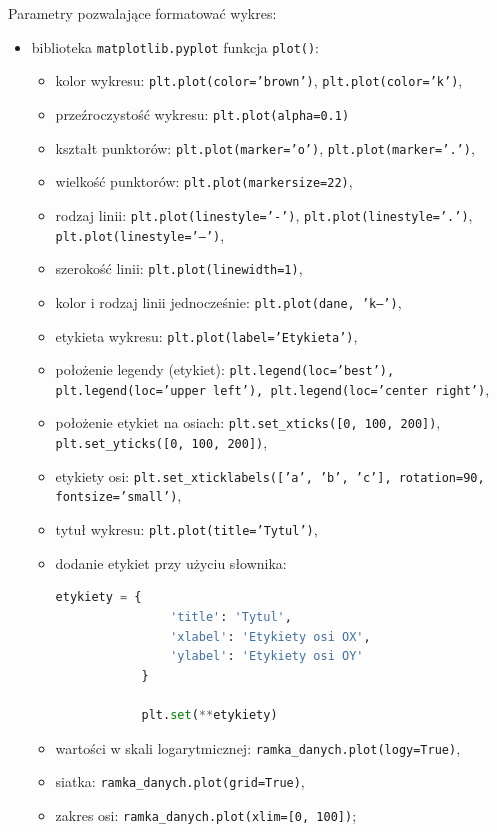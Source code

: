 \documentclass[11pt]{report}
\begin{document}
Parametry pozwalające formatować wykres:

\begin{itemize}
    \item biblioteka  \texttt{matplotlib.pyplot} funkcja \texttt{plot()}:
          \begin{itemize}
              \item kolor wykresu: \texttt{plt.plot(color='brown')}, \texttt{plt.plot(color='k')},
              \item przeźroczystość wykresu: \texttt{plt.plot(alpha=0.1)}
              \item kształt punktorów: \texttt{plt.plot(marker='o')}, \texttt{plt.plot(marker='.')},
              \item wielkość punktorów: \texttt{plt.plot(markersize=22)},
              \item rodzaj linii: \texttt{plt.plot(linestyle='-')}, \texttt{plt.plot(linestyle='.')},\\ \texttt{plt.plot(linestyle='--')},
              \item szerokość linii: \texttt{plt.plot(linewidth=1)},
              \item kolor i rodzaj linii jednocześnie: \texttt{plt.plot(dane, 'k--')},
              \item etykieta wykresu: \texttt{plt.plot(label='Etykieta')},
              \item położenie legendy (etykiet): \texttt{plt.legend(loc='best'), \texttt{plt.legend(loc='upper left')}, \texttt{plt.legend(loc='center right')}},
              \item położenie etykiet na osiach: \texttt{plt.set\_xticks([0, 100, 200])}, \texttt{plt.set\_yticks([0, 100, 200])},
              \item etykiety osi: \texttt{plt.set\_xticklabels(['a', 'b', 'c'], rotation=90, fontsize='small')},
              \item tytuł wykresu: \texttt{plt.plot(title='Tytul')},
              \item dodanie etykiet przy użyciu słownika:

                    \begin{lstlisting}[language=Python]
            etykiety = {
                'title': 'Tytul',
                'xlabel': 'Etykiety osi OX',
                'ylabel': 'Etykiety osi OY'
            }
            
            plt.set(**etykiety)
        \end{lstlisting}

              \item wartości w skali logarytmicznej: \texttt{ramka\_danych.plot(logy=True)},
              \item siatka: \texttt{ramka\_danych.plot(grid=True)},
              \item zakres osi: \texttt{ramka\_danych.plot(xlim=[0, 100])};

          \end{itemize}

\end{itemize}
\end{document}

